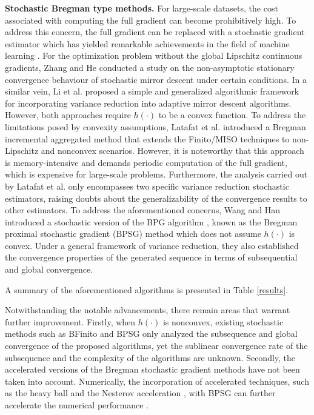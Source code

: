 \documentclass[letterpaper]{article} %
\begin{document}
	\textbf{Stochastic Bregman type methods.} For large-scale datasets, the cost associated with computing the full gradient can become prohibitively high.  To address this concern, the full gradient can be replaced with a stochastic gradient estimator \cite{RobbinsM1951, Bottou10} which has yielded remarkable achievements in the field of machine learning \cite{LinLF2020book, Lan2020First}. For the optimization problem without the global  Lipschitz continuous gradients, Zhang and He \cite{ZhangH18} conducted a study on the non-asymptotic stationary convergence behaviour of stochastic mirror descent under certain conditions.  In a similar vein, Li et al. \cite{LiWZC22} proposed a simple and generalized algorithmic framework for incorporating variance reduction into adaptive mirror descent algorithms. However, both approaches \cite{ZhangH18, LiWZC22} require $h(\cdot)$ to be a convex function. To address the limitations posed by convexity assumptions, Latafat et al. \cite{LatafatTAP22} introduced a  Bregman incremental aggregated method that extends the Finito/MISO techniques\cite{DefazioDC14, Mairal15} to non-Lipschitz and nonconvex scenarios. However, it is noteworthy that this approach is memory-intensive and demands periodic computation of the full gradient, which is expensive for large-scale problems. Furthermore, the analysis carried out by Latafat et al. \cite{LatafatTAP22} only encompasses two specific variance reduction stochastic estimators, raising doubts about the generalizability of the convergence results to other estimators. To address the aforementioned concerns,  Wang and Han \cite{WangH23} introduced a stochastic version of the BPG algorithm \cite{BolteSTV18First}, known as the Bregman proximal stochastic gradient (BPSG) method which does not assume $h(\cdot)$ is convex. Under a general framework of variance reduction, they also established the convergence properties of the generated sequence in terms of subsequential and global convergence.

	A summary of the aforementioned algorithms is presented in Table \ref{results}.

	Notwithstanding the notable advancements, there remain areas that warrant further improvement.  Firstly,
	when $h(\cdot)$ is nonconvex, existing stochastic methods such as BFinito \cite{LatafatTAP22} and BPSG \cite{WangH23}   only analyzed the subsequence and global convergence of the proposed algorithms, yet the sublinear convergence rate of the subsequence and the complexity of the algorithms are unknown.
	Secondly, the accelerated versions of the Bregman stochastic gradient methods  %
	have not been taken into account.
	Numerically, the incorporation of accelerated techniques, such as the heavy ball \cite{Polyak64} and the Nesterov acceleration \cite{Nesterov1983}, with BPSG can further accelerate the numerical performance \cite{LinLF2020book}.
\end{document}
